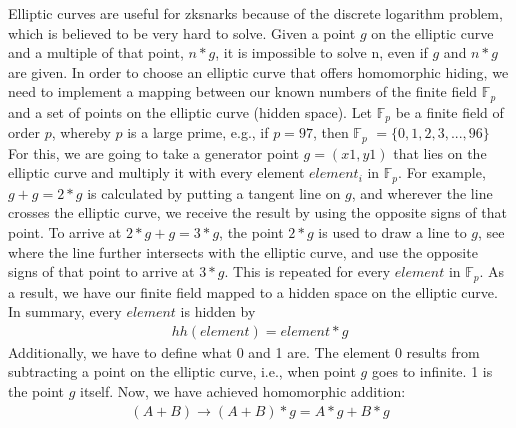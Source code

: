 Elliptic curves are useful for \acrshort{zksnark}s because of the discrete logarithm problem, which is believed to be very hard to solve. Given a point \(g\) on the elliptic curve and a multiple of that point, \(n*g\), it is impossible to solve n, even if \(g\) and \(n*g\) are given. In order to choose an elliptic curve that offers homomorphic hiding, we need to implement a mapping between our known numbers of the finite field \begin{math}\mathbb{F}_p\end{math} and a set of points on the elliptic curve (hidden space). Let \begin{math}\mathbb{F}_p\end{math} be a finite field of order \(p\), whereby \(p\) is a large prime, e.g., if \(p=97\), then \begin{math}\mathbb{F}_p\end{math} \(=\{0, 1, 2, 3, ..., 96\}\) For this, we are going to take a generator point \(g = (x1,y1)\) that lies on the elliptic curve and multiply it with every element \({element}_i\) in \begin{math}\mathbb{F}_p\end{math}. For example, \(g + g = 2*g\) is calculated by putting a tangent line on \(g\), and wherever the line crosses the elliptic curve, we receive the result by using the opposite signs of that point. To arrive at \(2*g + g = 3*g\), the point \(2*g\) is used to draw a line to \(g\), see where the line further intersects with the elliptic curve, and use the opposite signs of that point to arrive at \(3*g\). This is repeated for every \(element\) in \begin{math}\mathbb{F}_p\end{math}. As a result, we have our finite field mapped to a hidden space on the elliptic curve. In summary, every 
\(element\) is hidden by
\begin{align}
    hh(element) = element * g
\end{align}
Additionally, we have to define what 0 and 1 are. The element 0 results from subtracting a point on the elliptic curve, i.e., when point \(g\) goes to infinite. 1 is the point \(g\) itself.
Now, we have achieved homomorphic addition:
\begin{align}
    (A + B) \longrightarrow (A + B) * g = A*g + B*g
\end{align}

